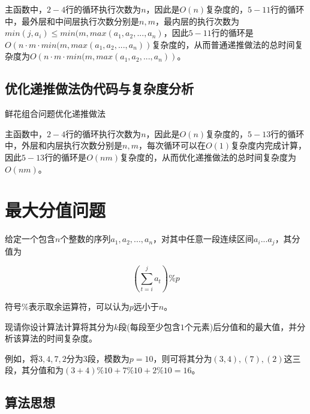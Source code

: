 \documentclass{article}
\begin{document}
主函数中，$2-4$行的循环执行次数为$n$，因此是$O(n)$复杂度的，$5-11$行的循环中，最外层和中间层执行次数分别是$n,m$，最内层的执行次数为$min(j,a_i)\le{min}(m,max(a_1,a_2,...,a_n)$，因此$5-11$行的循环是$O(n\cdot{m}\cdot{min(m,max(a_1,a_2,...,a_n)})$复杂度的，从而普通递推做法的总时间复杂度为$O(n\cdot{m}\cdot{min(m,max(a_1,a_2,...,a_n)})$。

\subsection{优化递推做法伪代码与复杂度分析}

\begin{algorithm}[H]

\caption{鲜花组合问题优化递推做法}
\LinesNumbered
{}


\end{algorithm}

主函数中，$2-4$行的循环执行次数为$n$，因此是$O(n)$复杂度的，$5-13$行的循环中，外层和内层执行次数分别是$n,m$，每次循环可以在$O(1)$复杂度内完成计算，因此$5-13$行的循环是$O(n m)$复杂度的，从而优化递推做法的总时间复杂度为$O(n m)$。

\section{最大分值问题}

给定一个包含$n$个整数的序列$a_1,a_2,...,a_n$，对其中任意一段连续区间$a_i...a_j$，其分值为

$$
(\sum_{t=i}^j{a_t})\%p
$$

符号$\%$表示取余运算符，可以认为$p$远小于$n$。

现请你设计算法计算将其分为$k$段(每段至少包含$1$个元素)后分值和的最大值，并分析该算法的时间复杂度。

例如，将$3,4,7,2$分为$3$段，模数为$p=10$，则可将其分为$(3,4),(7),(2)$这三段，其分值和为$(3+4)\%10+7\%10+2\%10=16$。

\subsection{算法思想}
\end{document}
